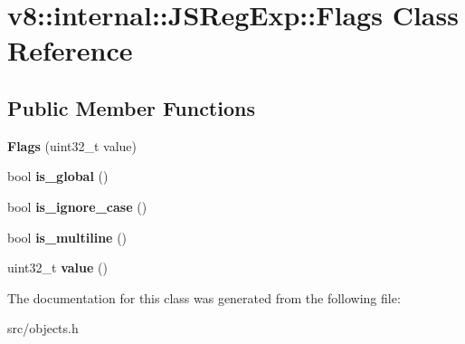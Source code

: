 \hypertarget{classv8_1_1internal_1_1_j_s_reg_exp_1_1_flags}{}\section{v8\+:\+:internal\+:\+:J\+S\+Reg\+Exp\+:\+:Flags Class Reference}
\label{classv8_1_1internal_1_1_j_s_reg_exp_1_1_flags}
\subsection*{Public Member Functions}
\begin{DoxyCompactItemize}
\item 
\hypertarget{classv8_1_1internal_1_1_j_s_reg_exp_1_1_flags_a643375d4a5b390c1196a2324487d359c}{}{\bfseries Flags} (uint32\+\_\+t value)\label{classv8_1_1internal_1_1_j_s_reg_exp_1_1_flags_a643375d4a5b390c1196a2324487d359c}

\item 
\hypertarget{classv8_1_1internal_1_1_j_s_reg_exp_1_1_flags_a0618425512d031751f66d70e5e140791}{}bool {\bfseries is\+\_\+global} ()\label{classv8_1_1internal_1_1_j_s_reg_exp_1_1_flags_a0618425512d031751f66d70e5e140791}

\item 
\hypertarget{classv8_1_1internal_1_1_j_s_reg_exp_1_1_flags_a098c9a6558b2a28eb164a52d9433bd83}{}bool {\bfseries is\+\_\+ignore\+\_\+case} ()\label{classv8_1_1internal_1_1_j_s_reg_exp_1_1_flags_a098c9a6558b2a28eb164a52d9433bd83}

\item 
\hypertarget{classv8_1_1internal_1_1_j_s_reg_exp_1_1_flags_aa7f3a013c13044d99150a4b1abc54a05}{}bool {\bfseries is\+\_\+multiline} ()\label{classv8_1_1internal_1_1_j_s_reg_exp_1_1_flags_aa7f3a013c13044d99150a4b1abc54a05}

\item 
\hypertarget{classv8_1_1internal_1_1_j_s_reg_exp_1_1_flags_a03dcf58bb44487aa3b1516be0ceaf4a8}{}uint32\+\_\+t {\bfseries value} ()\label{classv8_1_1internal_1_1_j_s_reg_exp_1_1_flags_a03dcf58bb44487aa3b1516be0ceaf4a8}

\end{DoxyCompactItemize}


The documentation for this class was generated from the following file\+:\begin{DoxyCompactItemize}
\item 
src/objects.\+h\end{DoxyCompactItemize}
